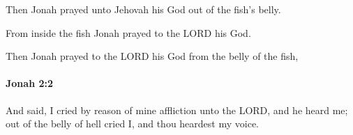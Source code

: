 			\begin{versebox}
					\item[BHS] 
					\item[LXX] 
					\item[ASV] Then Jonah prayed unto Jehovah his God out of the fish's belly.
					\item[NIV] From inside the fish Jonah prayed to the LORD his God.
					\item[NRSV] Then Jonah prayed to the LORD his God from the belly of the fish,
			\end{versebox}

		\paragraph{Jonah 2:2} %
			\label{JONAH-2-2}

			And said, I cried by reason of mine affliction unto the LORD, and he heard me; out of the belly of hell cried I, and thou heardest my voice.

